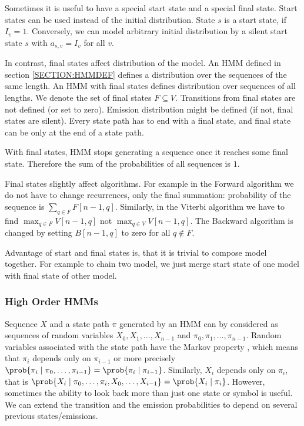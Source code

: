 Sometimes it is useful to have a special start state and a special final state.
Start states can be used instead of the initial distribution. State $s$ is a start
state, if $I_v=1$. Conversely, we can model arbitrary initial distribution by a silent start state $s$
with $a_{s,v}=I_v$ for all $v$.

In contrast, final states affect distribution of the model. An HMM defined in section
\ref{SECTION:HMMDEF} defines a distribution over the sequences of the same length.
An HMM with
final states defines distribution over sequences of all lengths.  We denote the
set of final states $F\subseteq V$. Transitions from final states are not
defined (or set to zero). Emission distribution might be defined (if not, final
states are silent). Every state path has to end with a final state, and
final state can be only at the end of a state path.

With final states, HMM stops generating a sequence once it reaches some final
state. Therefore the sum of the probabilities of all sequences is $1$.

Final states slightly affect algorithms. For example in the Forward algorithm
we do not have to change recurrences, only the final summation: probability of
the sequence is $\sum_{q\in F}F[n-1,q]$.  Similarly, in the Viterbi algorithm
we have to find $\max_{q\in F} V[n-1,q]$ not $\max_{q\in V} V[n-1,q]$.  The
Backward algorithm is changed by setting $B[n-1,q]$ to zero for all $q\notin
F$.

Advantage of start and final states is, that it is trivial to compose model
together.  For example to chain two model, we just merge start state of one
model with final state of other model.

\subsubsection{High Order HMMs}

Sequence $X$ and a state path $\pi$ generated by an HMM can by considered as
sequences of random variables $X_0,X_1,\dots, X_{n-1}$ and
$\pi_0,\pi_1,\dots,\pi_{n-1}$.  Random variables associated with the state path
have the Markov property \cite{Levin2006}, which means that $\pi_i$ depends
only on $\pi_{i-1}$ or more precisely
$\prob{\pi_i\mid\pi_0,\dots,\pi_{i-1}}=\prob{\pi_i\mid\pi_{i-1}}$. Similarly,
$X_i$ depends only on $\pi_i$, that is
$\prob{X_i\mid\pi_0,\dots,\pi_i,X_0,\dots,X_{i-1}}=\prob{X_i\mid\pi_i}$.
However, sometimes the  ability to look back more than just one state or symbol
is useful. We can extend the transition and the emission probabilities to
depend on several previous states/emissions. 

